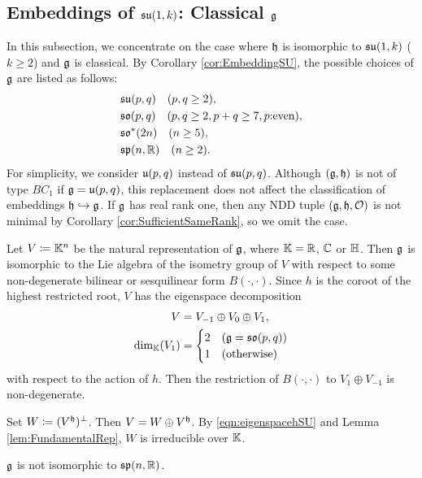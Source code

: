 \subsection{Embeddings of \texorpdfstring{$\mathfrak{su}(1, k)$}{su(1,k)}: Classical \texorpdfstring{$\mathfrak{g}$}{g}}

In this subsection, we concentrate on the case where $\mathfrak{h}$ is isomorphic to $\mathfrak{su}(1, k)$ ($k \geq 2$) and $\mathfrak{g}$ is classical.
By Corollary \ref{cor:EmbeddingSU}, the possible choices of $\mathfrak{g}$ are listed as follows:
\begin{align*}
	&\mathfrak{su}(p, q) \quad (p, q \geq 2), \\
	&\mathfrak{so}(p, q) \quad (p, q \geq 2, p+q\geq 7, p\text{:even}), \\
	&\mathfrak{so}^*(2n) \quad (n \geq 5), \\
	&\mathfrak{sp}(n,\mathbb{R}) \quad (n \geq 2).
\end{align*}
For simplicity, we consider $\mathfrak{u}(p, q)$ instead of $\mathfrak{su}(p, q)$.
Although $(\mathfrak{g}, \mathfrak{h})$ is not of type $BC_1$ if $\mathfrak{g} = \mathfrak{u}(p, q)$, this replacement does not affect the classification of embeddings $\mathfrak{h}\hookrightarrow \mathfrak{g}$.
If $\mathfrak{g}$ has real rank one, then any NDD tuple $(\mathfrak{g}, \mathfrak{h}, \mathcal{O})$ is not minimal by Corollary \ref{cor:SufficientSameRank}, so we omit the case.

Let $V\coloneq \mathbb{K}^n$ be the natural representation of $\mathfrak{g}$, where $\mathbb{K} = \mathbb{R}$, $\mathbb{C}$ or $\mathbb{H}$.
Then $\mathfrak{g}$ is isomorphic to the Lie algebra of the isometry group of $V$ with respect to some non-degenerate bilinear or sesquilinear form $B(\cdot, \cdot)$.
Since $h$ is the coroot of the highest restricted root, $V$ has the eigenspace decomposition
\begin{align}
	V &= V_{-1} \oplus V_0 \oplus V_1, \\
	\dim_{\mathbb{K}}(V_1) &= \begin{cases}
		2 & (\mathfrak{g} = \mathfrak{so}(p, q)) \\
		1 & (\text{otherwise})
	\end{cases} \label{eqn:eigenspacehSU}
\end{align}
with respect to the action of $h$.
Then the restriction of $B(\cdot, \cdot)$ to $V_1\oplus V_{-1}$ is non-degenerate.

Set $W \coloneq (V^{\mathfrak{h}})^\perp$.
Then $V = W \oplus V^{\mathfrak{h}}$.
By \eqref{eqn:eigenspacehSU} and Lemma \ref{lem:FundamentalRep}, $W$ is irreducible over $\mathbb{K}$.

\begin{lemma} \label{lem:EmbeddingSUtoSp}
	$\mathfrak{g}$ is not isomorphic to $\mathfrak{sp}(n, \mathbb{R})$.
\end{lemma}

